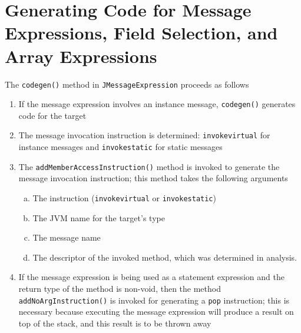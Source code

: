 \documentclass[8pt,a4paper,compress]{beamer}
\begin{document}
\section{Generating Code for Message Expressions, Field Selection, and Array Expressions}
\begin{frame}[fragile]
\pause

The \lstinline{codegen()} method in \lstinline{JMessageExpression} proceeds as follows
\begin{enumerate}
\pause
\item If the message expression involves an instance message, \lstinline{codegen()} generates code for the target
\pause
\item The message invocation instruction is determined: \lstinline{invokevirtual} for instance messages and \lstinline{invokestatic} for static messages
\pause
\item The \lstinline{addMemberAccessInstruction()} method is invoked to generate the message invocation instruction; this method takes the following arguments
\begin{enumerate}[(a)]
\pause
\item The instruction (\lstinline{invokevirtual} or \lstinline{invokestatic})
\pause
\item The JVM name for the target's type
\pause
\item The message name
\pause
\item The descriptor of the invoked method, which was determined in analysis.
\end{enumerate}
\pause
\item If the message expression is being used as a statement expression and the return type of the method  is non-void, then the method \lstinline{addNoArgInstruction()} is invoked for generating a \lstinline{pop} instruction; this is necessary because executing the message expression will produce a result on top of the stack, and this result is to be thrown away
\end{enumerate}
\end{frame}
\end{document}
